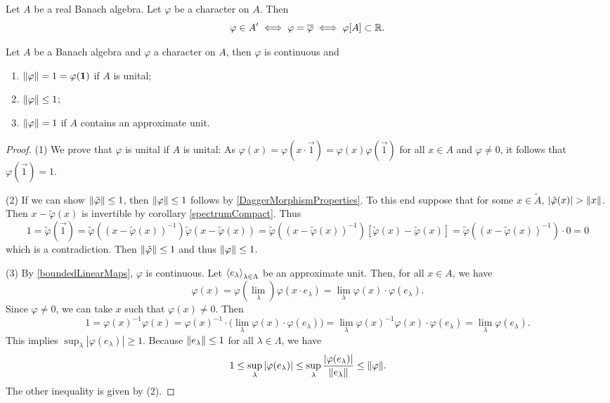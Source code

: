 \begin{lemma}
Let $A$ be a real Banach algebra. Let $\varphi$ be a character on $A$. Then
\[ \varphi \in {A}^\prime \iff \varphi = \overline{\varphi} \iff \varphi[A] \subset \mathbb{R}. \]
\end{lemma}

\begin{proposition} \label{charactersUnital}
Let $A$ be a Banach algebra and $\varphi$ a character on $A$, then $\varphi$ is continuous and
\begin{enumerate}
\item $\lVert\varphi\rVert = 1 = \varphi(\boldsymbol{\mathrm{1}})$ if $A$ is unital;
\item $\lVert\varphi\rVert\leq 1$;
\item $\lVert\varphi\rVert = 1$ if $A$ contains an approximate unit.
\end{enumerate}
\end{proposition}
\begin{proof}
(1) We prove that $\varphi$ is unital if $A$ is unital: As $\varphi(x) = \varphi(x\cdot\vec{1}) = \varphi(x)\varphi(\vec{1})$ for all $x\in A$ and $\varphi \neq 0$, it follows that $\varphi(\vec{1}) = 1$.

(2) If we can show $\lVert\tilde{\varphi}\rVert \leq 1$, then $\lVert\varphi\rVert\leq 1$ follows by \ref{DaggerMorphismProperties}. To this end suppose that for some $x\in \tilde{A}$, $|\tilde{\varphi}(x)|>\norm{x}$. Then $x-\tilde{\varphi}(x)$ is invertible by corollary \ref{spectrumCompact}. Thus
\[ 1 = \tilde{\varphi}(\vec{1}) = \tilde{\varphi}((x-\tilde{\varphi}(x))^{-1})\tilde{\varphi}(x-\tilde{\varphi}(x)) = \tilde{\varphi}((x-\tilde{\varphi}(x))^{-1})[\tilde{\varphi}(x)-\tilde{\varphi}(x)] = \tilde{\varphi}((x-\tilde{\varphi}(x))^{-1})\cdot 0 = 0 \]
which is a contradiction. Then $\lVert\tilde{\varphi}\rVert \leq 1$ and thus $\lVert\varphi\rVert \leq 1$.

(3) By \ref{boundedLinearMaps}, $\varphi$ is continuous. Let $\left\langle e_\lambda \right\rangle_{\lambda\in\Lambda}$ be an approximate unit.
Then, for all $x\in A$, we have
\[ \varphi(x) = \varphi(\lim_\lambda)\varphi(x\cdot e_\lambda) = \lim_\lambda \varphi(x)\cdot \varphi(e_\lambda). \]
Since $\varphi\neq 0$, we can take $x$ such that $\varphi(x)\neq 0$. Then
\[ 1 = \varphi(x)^{-1}\varphi(x) = \varphi(x)^{-1}\cdot\big(\lim_\lambda \varphi(x)\cdot \varphi(e_\lambda)\big) = \lim_\lambda \varphi(x)^{-1}\varphi(x)\cdot \varphi(e_\lambda) = \lim_\lambda \varphi(e_\lambda). \]
This implies $\sup_{\lambda}|\varphi(e_\lambda)| \geq 1$. Because $\lVert e_\lambda\rVert\leq 1$ for all $\lambda\in\Lambda$, we have
\[ 1 \leq \sup_{\lambda}|\varphi(e_\lambda)| \leq \sup_{\lambda}\frac{|\varphi(e_\lambda)|}{\lVert e_\lambda\rVert} \leq \lVert\varphi\rVert. \]
The other inequality is given by (2).
\end{proof}


